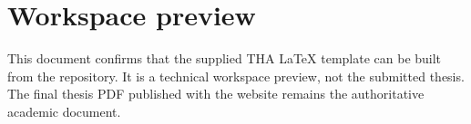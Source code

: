 \documentclass[
  12pt,
  a4paper,
  oneside,
  titlepage,
  DIV=13,
  headinclude,
  footinclude=false,
  cleardoublepage=empty,
  parskip=half,
  BCOR=0mm
]{scrreprt}
\begin{document}
\selectlanguage{\thesisLanguage}

\setcounter{page}{1}
\THAtitlepage
\tableofcontents

\clearpage
{}
\setcounter{page}{1}

\chapter{Workspace preview}

This document confirms that the supplied THA LaTeX template can be built from the repository. It is a technical workspace preview, not the submitted thesis. The final thesis PDF published with the website remains the authoritative academic document.
\end{document}
